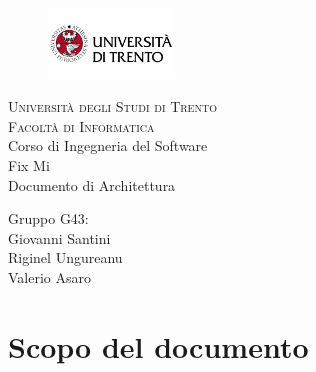 \documentclass{report}
\begin{document}
	
	
	\begin{titlepage}
		\begin{figure}[t]
			\centering\includegraphics[width=0.3\textwidth]{images/unitn-logo}
		\end{figure}
		\begin{center}
			\textsc{ \LARGE{Università degli Studi di Trento \\}}
			\textsc{ \LARGE{Facoltà di Informatica\\ }}
			\textnormal{ \LARGE{Corso di Ingegneria del Software\\}}
			\vspace{30mm}
			\fontsize{10mm}{7mm}\selectfont 
			\textup{Fix Mi \\ Documento di Architettura}\\
		\end{center}
		
		\vspace{25mm}
		
		\centering
		\large Gruppo G43: \\ Giovanni Santini\\ Riginel Ungureanu \\ Valerio Asaro
		
		\vspace{20mm}
		
		
	\end{titlepage}
	
	
	
	
	\pagestyle{fancy}
	\fancyhead[R]{\chaptername\ \thechapter}  %
	
	\tableofcontents
	\newpage
	
	
	
	\section{Scopo del documento}
	
\end{document}
